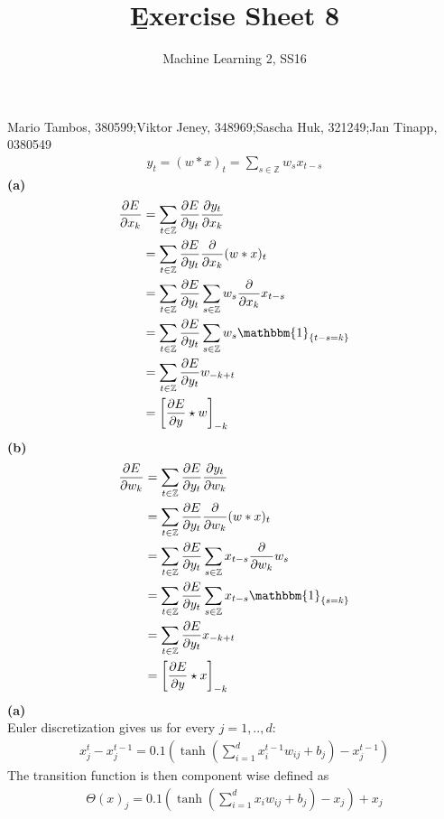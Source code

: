 \documentclass[a4paper]{article}
\newcommand{\1}{\mathds{1}}
\begin{document}
\title{\b{Exercise Sheet 8}}
\author{Machine Learning 2, SS16}

\maketitle

Mario Tambos, 380599;\quad Viktor Jeney, 348969;\quad Sascha Huk, 321249;\quad Jan Tinapp, 0380549\\


\begin{align*}
y_t=(w\ast x)_t=\sum_{s\in\mathbb{Z}}w_sx_{t-s}
\end{align*}
\textbf{(a)}\\
\begin{align*}
\frac{\partial E}{\partial x_k}
&=\sum_{t\in\mathbb{Z}}\frac{\partial E}{\partial y_t}\frac{\partial y_t}{\partial x_k}\\
&=\sum_{t\in\mathbb{Z}}\frac{\partial E}{\partial y_t}\frac{\partial}{\partial x_k}(w\ast x)_t\\
&=\sum_{t\in\mathbb{Z}}\frac{\partial E}{\partial y_t}\sum_{s\in\mathbb{Z}}w_s\frac{\partial}{\partial x_k}x_{t-s}\\
&=\sum_{t\in\mathbb{Z}}\frac{\partial E}{\partial y_t}\sum_{s\in\mathbb{Z}}w_s\mathbbm{1}_{\{t-s=k\}}\\
&=\sum_{t\in\mathbb{Z}}\frac{\partial E}{\partial y_t}w_{-k+t}\\
&=\left[\frac{\partial E}{\partial y}\star w\right]_{-k}
\end{align*}
\textbf{(b)}\\
\begin{align*}
\frac{\partial E}{\partial w_k}
&=\sum_{t\in\mathbb{Z}}\frac{\partial E}{\partial y_t}\frac{\partial y_t}{\partial w_k}\\
&=\sum_{t\in\mathbb{Z}}\frac{\partial E}{\partial y_t}\frac{\partial}{\partial w_k}(w\ast x)_t\\
&=\sum_{t\in\mathbb{Z}}\frac{\partial E}{\partial y_t}\sum_{s\in\mathbb{Z}} x_{t-s}\frac{\partial}{\partial w_k}w_s\\
&=\sum_{t\in\mathbb{Z}}\frac{\partial E}{\partial y_t}\sum_{s\in\mathbb{Z}}x_{t-s}\mathbbm{1}_{\{s=k\}}\\
&=\sum_{t\in\mathbb{Z}}\frac{\partial E}{\partial y_t}x_{-k+t}\\
&=\left[\frac{\partial E}{\partial y}\star x\right]_{-k}
\end{align*}
\textbf{(a)}\\
Euler discretization gives us for every $j=1,..,d$:
\begin{align*}
x^t_j-x^{t-1}_j=0.1(\tanh(\sum_{i=1}^{d}x^{t-1}_i w_{ij}+b_j)-x^{t-1}_j)
\end{align*}
The transition function is then component wise defined as
\begin{align*}
\Theta(x)_j=0.1(\tanh(\sum_{i=1}^{d}x_i w_{ij}+b_j)-x_j)+x_j
\end{align*}
\end{document}
